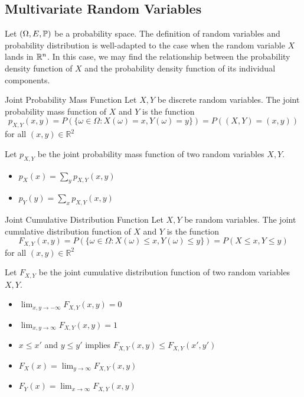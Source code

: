 \documentclass[a4paper]{article}
\begin{document}
\subsection{Multivariate Random Variables}
Let $(\Omega,E,\mathbb{P})$ be a probability space. The definition of random variables and probability distribution is well-adapted to the case when the random variable $X$ lands in $\mathbb{R}^n$. In this case, we may find the relationship between the probability density function of $X$ and the probability density function of its individual components. 






\begin{defn}{Joint Probability Mass Function}{} Let $X,Y$ be discrete random variables. The joint probability mass function of $X$ and $Y$ is the function $$p_{X,Y}(x,y)=P(\{\omega\in\Omega:X(\omega)=x,Y(\omega)=y\})=P((X,Y)=(x,y))$$ for all $(x,y)\in\mathbb{R}^2$
\end{defn}

\begin{thm}{}{} Let $p_{X,Y}$ be the joint probability mass function of two random variables $X,Y$. 
\begin{itemize}
\item $p_X(x)=\sum_{y}p_{X,Y}(x,y)$
\item $p_Y(y)=\sum_{x}p_{X,Y}(x,y)$
\end{itemize}
\end{thm}

\begin{defn}{Joint Cumulative Distribution Function}{} Let $X,Y$ be random variables. The joint cumulative distribution function of $X$ and $Y$ is the function $$F_{X,Y}(x,y)=P(\{\omega\in\Omega:X(\omega)\leq x,Y(\omega)\leq y\})=P(X\leq x,Y\leq y)$$ for all $(x,y)\in\mathbb{R}^2$
\end{defn}

\begin{thm}{}{} Let $F_{X,Y}$ be the joint cumulative distribution function of two random variables $X,Y$. 
\begin{itemize}
\item $\lim_{x,y\to-\infty}F_{X,Y}(x,y)=0$
\item $\lim_{x,y\to\infty}F_{X,Y}(x,y)=1$
\item $x\leq x'$ and $y\leq y'$ implies $F_{X,Y}(x,y)\leq F_{X,Y}(x',y')$
\item $F_X(x)=\lim_{y\to\infty}F_{X,Y}(x,y)$
\item $F_Y(x)=\lim_{x\to\infty}F_{X,Y}(x,y)$
\end{itemize}
\end{thm}
\end{document}
